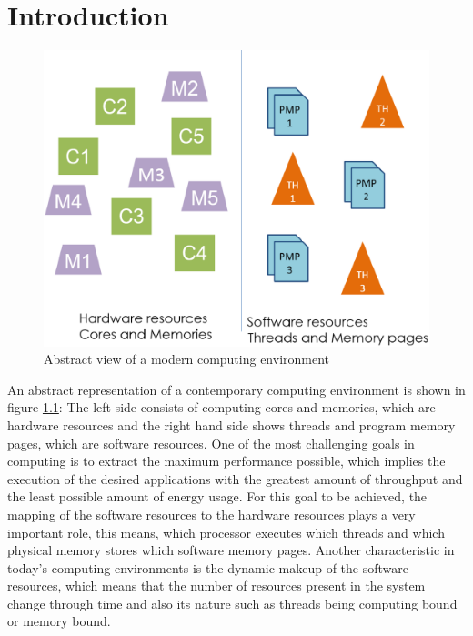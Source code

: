 \chapter{Introduction}\label{chapter:intro}

\begin{figure}[th]
	\centering
		\includegraphics[width=.6\textwidth]{figures/abstract-env.eps}
		\caption[Abstract view of a modern computing environment]{Abstract view of a modern computing environment}
		\label{fig:abstract-cmpenv}
\end{figure}

An abstract representation of a contemporary computing environment is shown in figure \ref{fig:abstract-cmpenv}: The left side consists of computing cores and memories, which are hardware resources and the right hand side shows threads and program memory pages, which are software resources. One of the most challenging goals in computing is to extract the maximum performance possible, which implies the execution of the desired applications with the greatest amount of throughput and the least possible amount of energy usage. For this goal to be achieved, the mapping of the software resources to the hardware resources plays a very important role, this means, which processor executes which threads and which physical memory stores which software memory pages. Another characteristic in today's computing environments is the dynamic makeup of the software resources, which means that the number of resources present in the system change through time and also its nature such as threads being computing bound or memory bound. 

